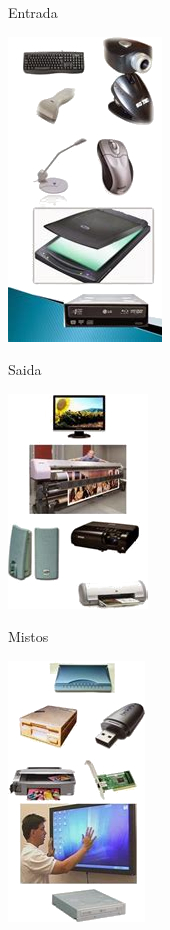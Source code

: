 {{{\vfill
\pagebreak

\begin{multicols}{3}
	
{\Large Entrada}
	
	\begin{center}
	\includegraphics[height=.9\textheight]{./IMG/entrada.jpg}
\end{center}

\vfill
\columnbreak

{\Large Saida}

\begin{center}
	\includegraphics[height=.9\textheight]{./IMG/saida.jpg}
\end{center}

\vfill
\columnbreak

{\Large Mistos}

\begin{center}
	\includegraphics[height=.9\textheight]{./IMG/mistos.jpg}
\end{center}


\end{multicols}}}}
